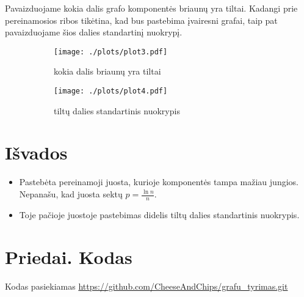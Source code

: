 \documentclass[bibliography=totoc]{article}
\begin{document}
Pavaizduojame kokia dalis grafo komponentės briaunų yra tiltai. Kadangi prie pereinamosios ribos tikėtina, kad bus pastebima įvairesni grafai, taip pat pavaizduojame šios dalies standartinį nuokrypį.
\begin{figure}[H]
    \begin{subfigure}{.5\textwidth}
        \begin{center}
            \texttt{[image: ./plots/plot3.pdf]}
        \end{center}
        \caption{kokia dalis briaunų yra tiltai}
    \end{subfigure}
    \begin{subfigure}{.5\textwidth}
        \begin{center}
            \texttt{[image: ./plots/plot4.pdf]}
        \end{center}
        \caption{tiltų dalies standartinis nuokrypis}
    \end{subfigure}
    \caption{}
\end{figure}

\newpage 
\section*{Išvados}
\label{sec:isvados}
\begin{itemize}
    \item{Pastebėta pereinamoji juosta, kurioje komponentės tampa mažiau jungios. Nepanašu, kad juosta sektų $p = \frac{\ln n}{n}$.}
    \item{Toje pačioje juostoje pastebimas didelis tiltų dalies standartinis nuokrypis.}
\end{itemize}

\newpage 


\newpage 
\appendix
\section*{Priedai. Kodas}
Kodas pasiekiamas \url{https://github.com/CheeseAndChips/grafu\_tyrimas.git}
\end{document}
